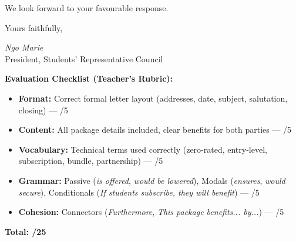 \documentclass[11pt]{article}
\begin{document}
\begin{exoresolu}
We look forward to your favourable response.

Yours faithfully,

\textit{Ngo Marie} \\
President, Students' Representative Council

\textbf{Evaluation Checklist (Teacher's Rubric):}
\begin{itemize}
    \item \textbf{Format:} Correct formal letter layout (addresses, date, subject, salutation, closing) — /5
    \item \textbf{Content:} All package details included, clear benefits for both parties — /5
    \item \textbf{Vocabulary:} Technical terms used correctly (zero-rated, entry-level, subscription, bundle, partnership) — /5
    \item \textbf{Grammar:} Passive (\emph{is offered}, \emph{would be lowered}), Modals (\emph{ensures}, \emph{would secure}), Conditionals (\emph{If students subscribe, they will benefit}) — /5
    \item \textbf{Cohesion:} Connectors (\emph{Furthermore}, \emph{This package benefits... by...}) — /5
\end{itemize}
\textbf{Total: /25}
\end{exoresolu}
\end{document}
